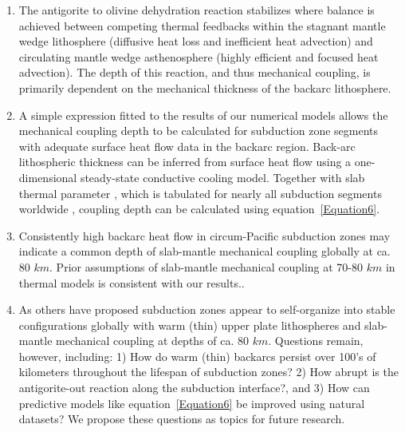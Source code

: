 \documentclass[draft]{agujournal2019}
\begin{document}
\begin{enumerate}
 \item The antigorite to olivine dehydration reaction stabilizes where balance is achieved between competing thermal feedbacks within the stagnant mantle wedge lithosphere (diffusive heat loss and inefficient heat advection) and circulating mantle wedge asthenosphere (highly efficient and focused heat advection). The depth of this reaction, and thus mechanical coupling, is primarily dependent on the mechanical thickness of the backarc lithosphere.

 \item A simple expression fitted to the results of our numerical models allows the mechanical coupling depth to be calculated for subduction zone segments with adequate surface heat flow data in the backarc region. Back-arc lithospheric thickness can be inferred from surface heat flow using a one-dimensional steady-state conductive cooling model. Together with slab thermal parameter , which is tabulated for nearly all subduction segments worldwide \cite{Syracuse2006, Syracuse2010}, coupling depth can be calculated using equation~\ref{Equation6}.

 \item Consistently high backarc heat flow in circum-Pacific subduction zones \cite{Currie2006, Wada2009} may indicate a common depth of slab-mantle mechanical coupling globally at ca. 80 $km$. Prior assumptions of slab-mantle mechanical coupling at 70-80 $km$ in thermal models is consistent with our results..

 \item As others have proposed \cite{Currie2006, Wada2009} subduction zones appear to self-organize into stable configurations globally with warm (thin) upper plate lithospheres and slab-mantle mechanical coupling at depths of ca. 80 $km$. Questions remain, however, including: 1) How do warm (thin) backarcs persist over 100's of kilometers throughout the lifespan of subduction zones? 2) How abrupt is the antigorite-out reaction along the subduction interface?, and 3) How can predictive models like equation~\ref{Equation6} be improved using natural datasets? We propose these questions as topics for future research.

\end{enumerate}

\appendix
\section{}
\end{document}
